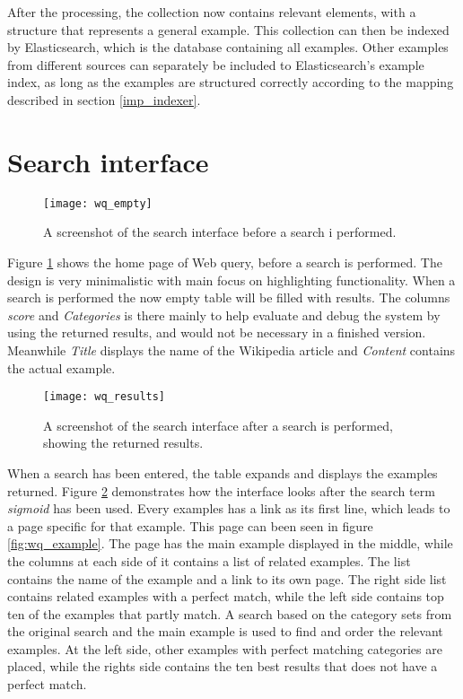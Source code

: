 After the processing, the collection now contains relevant elements, with a structure that represents a general example. This collection can then be indexed by Elasticsearch, which is the database containing all examples. Other examples from different sources can separately be included to Elasticsearch's example index, as long as the examples are structured correctly according to the mapping described in section \ref{imp_indexer}.

\section{Search interface}

\begin{figure}[H] 
\caption{A screenshot of the search interface before a search i performed.}
\texttt{[image: wq\_empty]}
\label{fig:wq_empty}
\end{figure}

Figure \ref{fig:wq_empty} shows the home page of Web query, before a search is performed. The design is very minimalistic with main focus on highlighting functionality. When a search is performed the now empty table will be filled with results. The columns \textit{score} and \textit{Categories} is there mainly to help evaluate and debug the system by using the returned results, and would not be necessary in a finished version. Meanwhile \textit{Title} displays the name of the Wikipedia article and \textit{Content} contains the actual example.


\begin{figure}[H] 
\caption{A screenshot of the search interface after a search is performed, showing the returned results.}
\texttt{[image: wq\_results]}
\label{fig:wq_results}
\end{figure}

When a search has been entered, the table expands and displays the examples returned. Figure \ref{fig:wq_results} demonstrates how the interface looks after the search term \textit{sigmoid} has been used. Every examples has a link as its first line, which leads to a page specific for that example. This page can been seen in figure \ref{fig:wq_example}. The page has the main example displayed in the middle, while the columns at each side of it contains a list of related examples. The list contains the name of the example and a link to its own page. The right side list contains related examples with a perfect match, while the left side contains top ten of the examples that partly match. A search based on the category sets from the original search and the main example is used to find and order the relevant examples. At the left side, other examples with perfect matching categories are placed, while the rights side contains the ten best results that does not have a perfect match.

